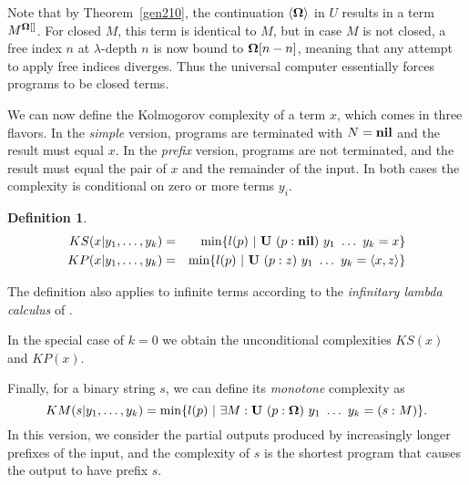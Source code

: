 \documentclass{article}
\newtheorem{definition}{Definition}
\newcommand{\tup}[1]{\langle #1 \rangle}
\newcommand{\pref}[2]{(#1:#2)}
\newcommand{\idx}[2]{#1[#2]}
\newcommand{\bnd}[2]{#1^{#2[]}}
\newcommand{\CU}{{\bf U}}
\newcommand{\COm}{{\bf \Omega}}
\newcommand{\Cnil}{{\bf nil}}
\begin{document}
Note that by Theorem~\ref{gen210},
the continuation $\tup{\COm}$ in $U$ results in a term
$\bnd{M}{\COm}$. For closed $M$, this term is identical to $M$,
but in case $M$ is not closed,
a free index $n$ at $\lambda$-depth $n$ is now bound to
$\idx{\COm}{n-n}$, meaning that any attempt to apply free indices diverges.
Thus the universal computer essentially forces programs to be closed terms.


We can now define the Kolmogorov complexity of a term $x$,
which comes in three flavors.
In the {\em simple} version, programs are terminated with
$N=\Cnil$ and the result must equal $x$.
In the {\em prefix} version, programs are not terminated,
and the result must equal the pair of $x$ and the remainder of the input.
In both cases the complexity is conditional on zero or more terms $y_i$.

\begin{definition}
\begin{eqnarray*}
KS(x|y_1,\ldots,y_{k}) & = &
\min \{ l(p)\ |\ \CU\ \pref{p}{\Cnil}\ y_1\ \ldots\ y_{k} =      x    \} \\
KP(x|y_1,\ldots,y_{k}) & = &
\min \{ l(p)\ |\ \CU\ \pref{p}{ z   }\ y_1\ \ldots\ y_{k} = \tup{x,z} \}
\end{eqnarray*}
\label{defait}
\end{definition}

The definition also applies to infinite terms according to the {\em infinitary lambda calculus}
of \cite{KKSV97}.

In the special case of $k=0$ we obtain the unconditional complexities
$KS(x)$ and $KP(x)$.

Finally, for a binary string $s$, we can define its {\em monotone} complexity
as
\[ KM(s|y_1,\ldots,y_{k}) =
\min \{ l(p)\ |\ \exists M:
   \CU\ \pref{p}{\COm }\ y_1\ \ldots\ y_{k} = \pref{s}{M} \}.\] 
In this version, we consider the partial outputs produced by increasingly
longer prefixes of the input, and the complexity of $s$ is the shortest
program that causes the output to have prefix $s$.
\end{document}
